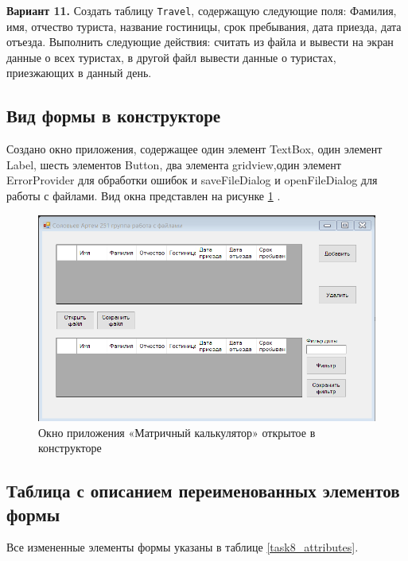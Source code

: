 \textbf{Вариант 11.} Создать таблицу \texttt{Travel}, содержащую следующие поля: Фамилия, имя, отчество туриста, название гостиницы, срок пребывания, дата приезда, дата отъезда. Выполнить следующие действия: считать из файла и вывести на экран данные о всех туристах, в другой файл вывести данные о туристах, приезжающих в данный день.

\subsection{Вид формы в конструкторе}


Создано окно приложения, содержащее один элемент TextBox, один элемент Label, шесть элементов Button, два элемента gridview,один элемент ErrorProvider для обработки ошибок и saveFileDialog и openFileDialog для работы с файлами. Вид окна представлен на рисунке \ref{task8_form} \cite{gladstone2022building}\cite{kaiser2022c++}.
\begin{figure}[H]
    \centering
    \includegraphics[width=1\linewidth]{lections/img/task8_form.png}
    \caption{Окно приложения «Матричный калькулятор» открытое в конструкторе}
    \label{task8_form}
\end{figure}


\subsection{Таблица с описанием переименованных элементов формы}
Все измененные элементы формы указаны в таблице \ref{task8_attributes}.


